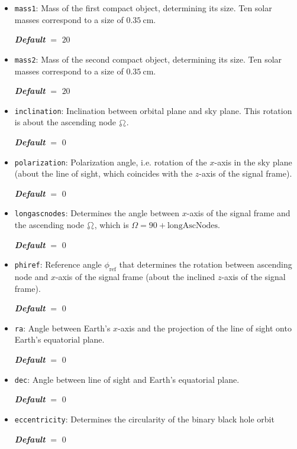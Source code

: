 \documentclass[
    DIV=11,
    BCOR=0mm,
    paper=a4,
    fontsize=11pt,
    twoside=false,
    titlepage=true
]{scrartcl}
\newcommand{\code}[1]{\textcolor{codecolor}{\texttt{#1}}}
\newcommand{\defaultval}[1]{%
    {\bfseries\slshape%
    Default} $=$ #1%
}
\begin{document}
\begin{itemize}
    \item \code{mass1}: Mass of the first compact object, determining its size. Ten solar masses correspond to a size of $\SI{0.35}{\centi\metre}$.

    \defaultval{$20$}


    \item \code{mass2}: Mass of the second compact object, determining its size. Ten solar masses correspond to a size of $\SI{0.35}{\centi\metre}$.

    \defaultval{$20$}


    \item \code{inclination}: Inclination between orbital plane and sky plane. This rotation is about the ascending node $\ascnode$.

    \defaultval{$0$}


    \item \code{polarization}: Polarization angle, i.e. rotation of the $x$-axis in the sky plane (about the line of sight, which coincides with the $z$-axis of the signal frame).

    \defaultval{$0$}


    \item \code{longascnodes}: Determines the angle between $x$-axis of the signal frame and the ascending node $\ascnode$, which is $\Omega = 90 + \mathrm{longAscNodes}$.

    \defaultval{$0$}


    \item \code{phiref}: Reference angle $\phi_\mathrm{ref}$ that determines the rotation between ascending node and $x$-axis of the signal frame (about the inclined $z$-axis of the signal frame).

    \defaultval{$0$}


    \item \code{ra}: Angle between Earth's $x$-axis and the projection of the line of sight onto Earth's equatorial plane.

    \defaultval{$0$}


    \item \code{dec}: Angle between line of sight and Earth's equatorial plane.

    \defaultval{$0$}


    \item \code{eccentricity}: Determines the circularity of the binary black hole orbit

    \defaultval{$0$}



\end{itemize}
\end{document}
